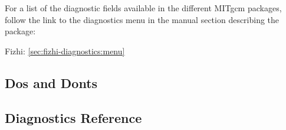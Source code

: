 

\newpage
\noindent For a list of the diagnostic fields available in the
different MITgcm packages, follow the link to the diagnostics menu
in the manual section describing the package:

Fizhi: \ref{sec:fizhi-diagnostics:menu}

\subsection{Dos and Donts}

\subsection{Diagnostics Reference}

